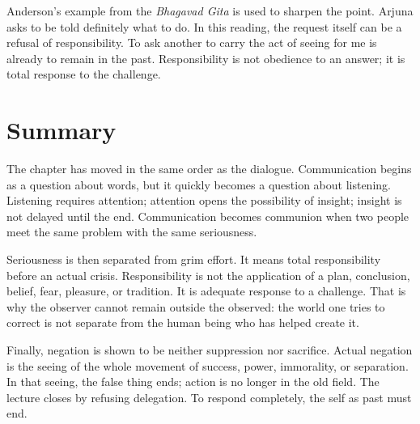 Anderson's example from the \emph{Bhagavad Gita} is used to sharpen the point. Arjuna asks to be told definitely what to do. In this reading, the request itself can be a refusal of responsibility. To ask another to carry the act of seeing for me is already to remain in the past. Responsibility is not obedience to an answer; it is total response to the challenge.

\section{Summary}

The chapter has moved in the same order as the dialogue. Communication begins as a question about words, but it quickly becomes a question about listening. Listening requires attention; attention opens the possibility of insight; insight is not delayed until the end. Communication becomes communion when two people meet the same problem with the same seriousness.

Seriousness is then separated from grim effort. It means total responsibility before an actual crisis. Responsibility is not the application of a plan, conclusion, belief, fear, pleasure, or tradition. It is adequate response to a challenge. That is why the observer cannot remain outside the observed: the world one tries to correct is not separate from the human being who has helped create it.

Finally, negation is shown to be neither suppression nor sacrifice. Actual negation is the seeing of the whole movement of success, power, immorality, or separation. In that seeing, the false thing ends; action is no longer in the old field. The lecture closes by refusing delegation. To respond completely, the self as past must end.